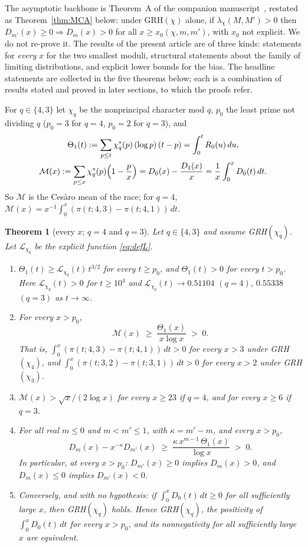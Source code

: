 \documentclass[11pt]{amsart}
\newtheorem{theorem}{Theorem}[section]
\theoremstyle{definition}
\numberwithin{equation}{section}
\newcommand{\cM}{\mathcal M}          %
\newcommand{\cL}{\mathcal L}          %
\begin{document}
The asymptotic backbone is Theorem~A of the companion
manuscript~\cite{MC}, restated as Theorem~\ref{thm:MCA} below: under
GRH$(\chi)$ alone, if $\lambda_\chi(M,M')>0$ then
$D_{m'}(x)\ge0\Rightarrow D_m(x)>0$ for all $x\ge x_0(\chi,m,m')$,
with $x_0$ not explicit. We do not re-prove it. The results of the
present article are of three kinds: statements for \emph{every} $x$
for the two smallest moduli, structural statements about the family
of limiting distributions, and explicit lower bounds for the bias.
The headline statements are collected in the five theorems below;
each is a combination of results stated and proved in later sections,
to which the proofs refer.

For $q\in\{4,3\}$ let $\chi_q$ be the nonprincipal character mod $q$,
$p_0$ the least prime not dividing $q$ ($p_0=3$ for $q=4$, $p_0=2$
for $q=3$), and
\begin{equation}\label{eq:defTheta1}
\begin{gathered}
\Theta_1(t):=\sum_{p\le t}\chi_q^*(p)\,(\log p)\,(t-p)=\int_0^tR_0(u)\,du,\\
\cM(x):=\sum_{p\le x}\chi_q^*(p)\Bigl(1-\frac px\Bigr)
=D_0(x)-\frac{D_1(x)}{x}=\frac1x\int_0^xD_0(t)\,dt .
\end{gathered}
\end{equation}
So $\cM$ is the Ces\`aro mean of the race; for $q=4$,
$\cM(x)=x^{-1}\int_0^x(\pi(t;4,3)-\pi(t;4,1))\,dt$.

\begin{theorem}[every $x$; $q=4$ and $q=3$]\label{thm:allx}
Let $q\in\{4,3\}$ and assume GRH$(\chi_q)$. Let $\cL_{\chi_q}$ be
the explicit function \eqref{eq:defL}.
\begin{enumerate}
\item[(i)] $\Theta_1(t)\ge\cL_{\chi_q}(t)\,t^{3/2}$ for every
$t\ge p_0$, and $\Theta_1(t)>0$ for every $t>p_0$. Here
$\cL_{\chi_q}(t)>0$ for $t\ge10^4$ and
$\cL_{\chi_q}(t)\to0.51104$ $(q=4)$, $0.55338$ $(q=3)$ as
$t\to\infty$.
\item[(ii)] For every $x>p_0$,
\[
\cM(x)\;\ge\;\frac{\Theta_1(x)}{x\log x}\;>\;0 .
\]
That is, $\int_0^x(\pi(t;4,3)-\pi(t;4,1))\,dt>0$ for every $x>3$
under GRH$(\chi_4)$, and
$\int_0^x(\pi(t;3,2)-\pi(t;3,1))\,dt>0$ for every $x>2$ under
GRH$(\chi_3)$.
\item[(iii)] $\cM(x)>\sqrt x/(2\log x)$ for every $x\ge23$ if $q=4$,
and for every $x\ge6$ if $q=3$.
\item[(iv)] For all real $m\le0$ and $m<m'\le1$, with $\kappa=m'-m$,
and every $x>p_0$,
\[
D_m(x)-x^{-\kappa}D_{m'}(x)\;\ge\;
\frac{\kappa\,x^{m-1}\,\Theta_1(x)}{\log x}\;>\;0 .
\]
In particular, at every $x>p_0$: $D_{m'}(x)\ge0$ implies $D_m(x)>0$,
and $D_m(x)\le0$ implies $D_{m'}(x)<0$.
\item[(v)] Conversely, and with no hypothesis: if
$\int_0^xD_0(t)\,dt\ge0$ for all sufficiently large $x$, then
GRH$(\chi_q)$ holds. Hence GRH$(\chi_q)$, the positivity of
$\int_0^xD_0(t)\,dt$ for every $x>p_0$, and its nonnegativity for
all sufficiently large $x$ are equivalent.
\end{enumerate}
\end{theorem}
\end{document}
